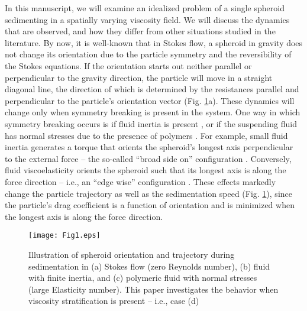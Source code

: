 \documentclass{jfm}
\begin{document}
In this manuscript, we will examine an idealized problem of a single spheroid sedimenting in a spatially varying viscosity field.  We will discuss the dynamics that are observed, and how they differ from other situations studied in the literature.  By now, it is well-known that in Stokes flow, a spheroid in gravity does not change its orientation due to the particle symmetry and the reversibility of the Stokes equations.  If the orientation starts out neither parallel or perpendicular to the gravity direction, the particle will move in a straight diagonal line, the direction of which is determined by the resistances parallel and perpendicular to the particle’s orientation vector (Fig. \ref{fig:example_sedimentation}a).  These dynamics will change only when symmetry breaking is present in the system.  One way in which symmetry breaking occurs is if fluid inertia is present \citep{Cox_1965,Khayat_Cox_1989,Auguste_JFM_2013}, or if the suspending fluid has normal stresses due to the presence of polymers \citep{Kim86,Galdi_JNNFM_2000,Galdi_MMAS_2011}.  For example, small fluid inertia generates a torque that orients the spheroid’s longest axis perpendicular to the external force -- the so-called ``broad side on'' configuration \citep{Dabade_Subramanian_2015}. Conversely, fluid viscoelasticity orients the spheroid such that its longest axis is along the force direction – i.e., an ``edge wise'' configuration \citep{Dabade_Subramanian_2015, Kim86}.  These effects markedly change the particle trajectory as well as the sedimentation speed (Fig. \ref{fig:example_sedimentation}), since the particle’s drag coefficient is a function of orientation and is minimized when the longest axis is along the force direction.

\begin{figure}
    \centering
    \texttt{[image: Fig1.eps]}
    \caption{Illustration of spheroid orientation and trajectory during sedimentation in (a) Stokes flow (zero Reynolds number), (b) fluid with finite inertia, and (c) polymeric fluid with normal stresses (large Elasticity number).  This paper investigates the behavior when viscosity stratification is present – i.e., case (d)}
    \label{fig:example_sedimentation}
\end{figure}
\end{document}
